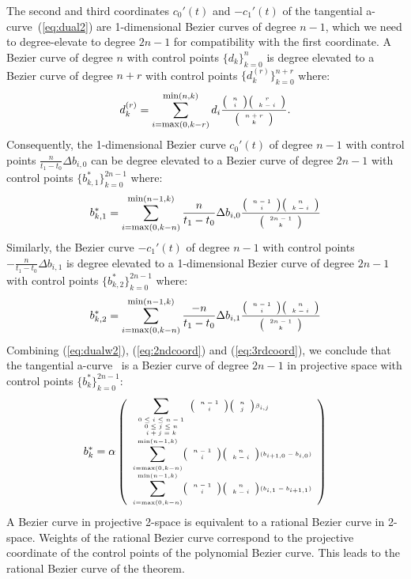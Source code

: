 \documentclass[12pt]{article}
\newcommand{\QED}{\vrule height 1.4ex width 1.0ex depth -.1ex\ \vspace{.3in}} %
\newcommand{\tinychoice}[2]{\mbox{\tiny{$\left( \begin{array}{c} #1 \\ #2 \end{array} \right)$}}}
\newcommand{\atang}{tangential a-curve\ }
\begin{document}
The second and third coordinates $c_0'(t)$ and $-c_1'(t)$
of the \atang (\ref{eq:dual2}) are 1-dimensional Bezier curves of degree $n-1$,
which we need to degree-elevate to degree $2n-1$
for compatibility with the first coordinate.
A Bezier curve of degree $n$ with control points $\{ d_k \}_{k=0}^n$ 
is degree elevated \cite{farin97} to a Bezier curve of degree $n+r$ with control points
$\{ d_k^{(r)} \}_{k=0}^{n+r}$ where:
\[
d_k^{(r)} = \sum_{i=\mbox{\footnotesize{max}}(0,k-r)}^{\mbox{\footnotesize{min}}(n,k)} 
		d_i \frac{\tinychoice{n}{i} \tinychoice{r}{k-i} }{ \tinychoice{n+r}{k} }.
\]
%
Consequently, the 1-dimensional Bezier curve $c_0'(t)$ 
of degree $n-1$ with control points $\frac{n}{t_1-t_0} \Delta b_{i,0}$ 
can be degree elevated to a Bezier curve of degree $2n-1$ with control points 
$\{b^*_{k,1} \}_{k=0}^{2n-1}$ where:
\begin{equation}
\label{eq:2ndcoord}
b^*_{k,1} = 
\sum_{i=\mbox{\footnotesize{max}}(0,k-n)}^{\mbox{\footnotesize{min}}(n-1,k)} 
	\frac{n}{t_1-t_0} \Delta b_{i,0}
	\frac{ \tinychoice{n-1}{i} \tinychoice{n}{k-i} }{ \tinychoice{2n-1}{k} }
\end{equation}
%
Similarly, the Bezier curve $-c_1'(t)$
of degree $n-1$ with control points $-\frac{n}{t_1-t_0} \Delta b_{i,1}$
is degree elevated to a 1-dimensional Bezier curve of degree $2n-1$
with control points $\{b^*_{k,2} \}_{k=0}^{2n-1}$ where:
\begin{equation}
\label{eq:3rdcoord}
b^*_{k,2} = 
\sum_{i=\mbox{\footnotesize{max}}(0,k-n)}^{\mbox{\footnotesize{min}}(n-1,k)} 
	\frac{-n}{t_1-t_0} \Delta b_{i,1}
	\frac{ \tinychoice{n-1}{i} \tinychoice{n}{k-i} }{ \tinychoice{2n-1}{k} }
\end{equation}
%
Combining (\ref{eq:dualw2}), (\ref{eq:2ndcoord}) and (\ref{eq:3rdcoord}),
we conclude that the \atang
is a Bezier curve of degree $2n-1$ in projective space with control points 
$\{b^*_k\}_{k=0}^{2n-1}$:
\[
\label{eq:dualcoord}
\tiny{
b^*_k = \alpha
\left(
\begin{array}{l}
	\displaystyle{\sum_{\begin{array}{c} \mbox{\tiny{$0 \leq i \leq n-1$}} \\ 
		       \mbox{\tiny{$0 \leq j \leq n$}} \\ 
		       \mbox{\tiny{$i+j=k$}} \end{array}}}
	\tinychoice{n-1}{i} \tinychoice{n}{j} \beta_{i,j} \\
%	
	\displaystyle{\sum_{i=\mbox{\tiny{max}}(0,k-n)}^{\mbox{\tiny{min}}(n-1,k)}}
	\tinychoice{n-1}{i} \tinychoice{n}{k-i} (b_{i+1,0} - b_{i,0})\\
%	
	\displaystyle{\sum_{i=\mbox{\tiny{max}}(0,k-n)}^{\mbox{\tiny{min}}(n-1,k)}}
	\tinychoice{n-1}{i} \tinychoice{n}{k-i} (b_{i,1} - b_{i+1,1})
\end{array}
\right)}
\]
%
A Bezier curve in projective 2-space is equivalent to a 
rational Bezier curve in 2-space.
Weights of the rational Bezier curve correspond to the
projective coordinate of the control points of the polynomial Bezier curve.
This leads to the rational Bezier curve of the theorem.
\QED
\end{document}
